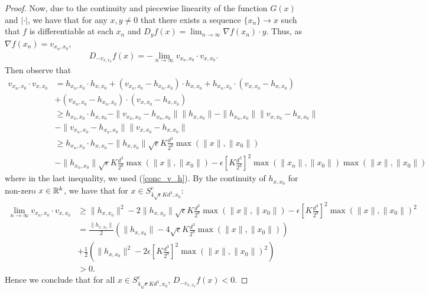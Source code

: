 \documentclass{article}
\begin{document}
\begin{proof}
Now, due to the continuity and piecewise linearity of the function $G(x)$ and $|\cdot|$, we have that for any $x,y \neq 0$ that there exists a sequence $\{x_n\} \rightarrow x$ such that $f$ is differentiable at each $x_n$ and $D_yf(x) = \lim_{n \rightarrow \infty} \nabla f(x_n)\cdot y$. Thus, as $\nabla f(x_n) = v_{x_n,x_0}$, \begin{align*}
D_{-v_{x,x_0}}f(x) = - \lim_{n \rightarrow \infty} v_{x_n,x_0} \cdot v_{x,x_0}. \label{direc_deriv_def}
\end{align*} Then observe that \begin{align*}
v_{x_n,x_0} \cdot v_{x,x_0}  & =  h_{x_n,x_0} \cdot h_{x,x_0} + (v_{x_n,x_0} - h_{x_n,x_0})\cdot h_{x,x_0} + h_{x_n,x_0}\cdot (v_{x,x_0 } - h_{x,x_0}) \\
& + (v_{x_n,x_0} - h_{x_n,x_0})\cdot (v_{x,x_0} - h_{x,x_0}) \\
&  \geq h_{x_n,x_0} \cdot h_{x,x_0} - \|v_{x_n,x_0} - h_{x_n,x_0}\|\|h_{x,x_0}\| - \|h_{x_n,x_0}\|\|v_{x,x_0 } - h_{x,x_0}\| \\
& - \|v_{x_n,x_0} - h_{x_n,x_0}\|\|v_{x,x_0} - h_{x,x_0}\| \\
& \geq h_{x_n,x_0} \cdot h_{x,x_0}  - \|h_{x,x_0}\|\sqrt{\epsilon}K \frac{d^3}{2^d}\max(\|x\|,\|x_0\|)  \\
& - \|h_{x_n,x_0}\|\sqrt{\epsilon}K \frac{d^3}{2^d}\max(\|x\|,\|x_0\|) - \epsilon \left[K \frac{d^3}{2^d}\right]^2 \max(\|x_n\|,\|x_0\|)\max(\|x\|,\|x_0\|)
\end{align*} where in the last inequality, we used (\ref{conc_v_h}).  By the continuity of $h_{x,x_0}$ for non-zero $x \in \mathbb{R}^k$, we have that for $x \in S_{4\sqrt{\epsilon}Kd^3,x_0}^c$: \begin{align*}
\lim_{n \rightarrow \infty} v_{x_n,x_0} \cdot v_{x,x_0} & \geq \|h_{x,x_0}\|^2 - 2\|h_{x,x_0}\|\sqrt{\epsilon}K \frac{d^3}{2^d}\max(\|x\|,\|x_0\|) - \epsilon \left[K \frac{d^3}{2^d}\right]^2 \max(\|x\|,\|x_0\|)^2 \\
& = \frac{\|h_{x,x_0}\|}{2}\left(\|h_{x,x_0}\| - 4\sqrt{\epsilon}K \frac{d^3}{2^d}\max(\|x\|,\|x_0\|)\right) \\
& + \frac{1}{2}\left(\|h_{x,x_0}\|^2 - 2\epsilon \left[K \frac{d^3}{2^d}\right]^2\max(\|x\|,\|x_0\|)^2\right) \\
& > 0.
\end{align*} Hence we conclude that for all $x \in S_{4\sqrt{\epsilon}Kd^3,x_0}^c$, $D_{-v_{x,x_0}}f(x) < 0$.


\end{proof}
\end{document}
